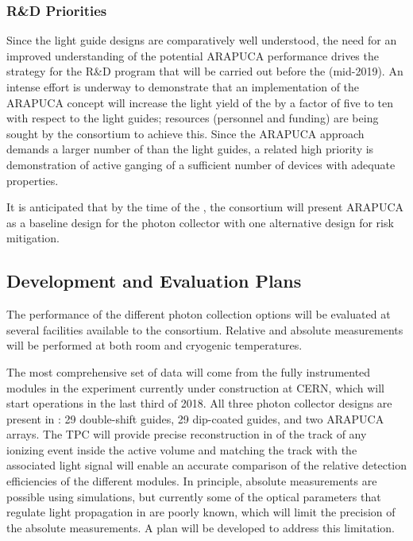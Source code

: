 \subsubsection{R\&D Priorities} 
Since the light guide designs are comparatively well understood, the need for an improved understanding of the potential ARAPUCA performance drives the strategy for the R\&D program that will be carried out before the  (mid-2019). 
An intense effort is underway to demonstrate that an implementation of the ARAPUCA concept will increase the light yield of the  by a factor of five to ten with respect to the light guides; resources (personnel and funding)  are being sought by the consortium to achieve this.  Since the ARAPUCA approach demands a larger number of  than the light guides, a related high priority is demonstration of active ganging of a sufficient number of devices with adequate  properties.

It is anticipated that by the time of the , the consortium will present ARAPUCA as a baseline design for the photon collector with one alternative design for risk mitigation.  


\subsection{Development and Evaluation Plans}

The performance of the different photon collection options will be evaluated at several facilities available to the consortium. 
Relative and absolute measurements will be performed at both room and cryogenic temperatures.

The most comprehensive set of data will come from the fully instrumented modules in the  experiment currently 
under construction at CERN, which will start operations in the last third of \num{2018}.
All  three photon collector designs are present in : \num{29} 
double-shift guides, \num{29} dip-coated guides, and two ARAPUCA arrays. 
The TPC will provide precise reconstruction in \threed of the track of any ionizing event inside the active volume and matching  
the track with the associated light signal will enable an accurate comparison of the relative detection efficiencies of the different  modules. 
In principle, absolute measurements are possible using  simulations, but currently some of the optical parameters that 
regulate  light propagation in \lar are poorly known,
which will limit the precision of the absolute  measurements. 
A plan will be developed to address this limitation.

